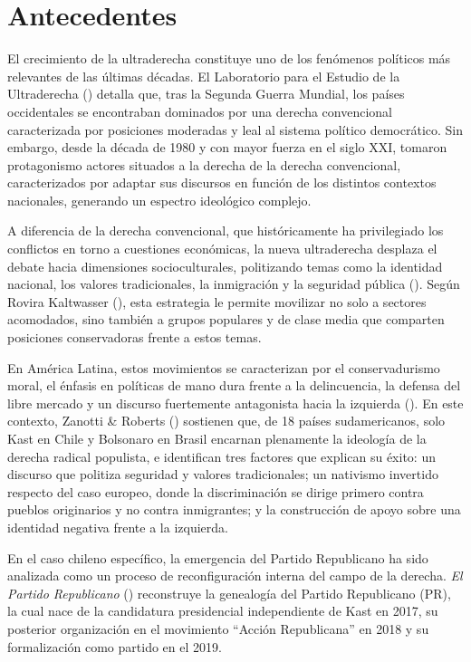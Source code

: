 \documentclass[
  spanish,
  a4paper,
  oneside]{scrbook}
\begin{document}
\chapter{Antecedentes}\label{antecedentes}

El crecimiento de la ultraderecha constituye uno de los fenómenos
políticos más relevantes de las últimas décadas. El Laboratorio para el
Estudio de la Ultraderecha () detalla
que, tras la Segunda Guerra Mundial, los países occidentales se
encontraban dominados por una derecha convencional caracterizada por
posiciones moderadas y leal al sistema político democrático. Sin
embargo, desde la década de 1980 y con mayor fuerza en el siglo XXI,
tomaron protagonismo actores situados a la derecha de la derecha
convencional, caracterizados por adaptar sus discursos en función de los
distintos contextos nacionales, generando un espectro ideológico
complejo.

A diferencia de la derecha convencional, que históricamente ha
privilegiado los conflictos en torno a cuestiones económicas, la nueva
ultraderecha desplaza el debate hacia dimensiones socioculturales,
politizando temas como la identidad nacional, los valores tradicionales,
la inmigración y la seguridad pública
(). Según
Rovira Kaltwasser
(), esta
estrategia le permite movilizar no solo a sectores acomodados, sino
también a grupos populares y de clase media que comparten posiciones
conservadoras frente a estos temas.

En América Latina, estos movimientos se caracterizan por el
conservadurismo moral, el énfasis en políticas de mano dura frente a la
delincuencia, la defensa del libre mercado y un discurso fuertemente
antagonista hacia la izquierda (). En este contexto, Zanotti \& Roberts
() sostienen que, de 18 países
sudamericanos, solo Kast en Chile y Bolsonaro en Brasil encarnan
plenamente la ideología de la derecha radical populista, e identifican
tres factores que explican su éxito: un discurso que politiza seguridad
y valores tradicionales; un nativismo invertido respecto del caso
europeo, donde la discriminación se dirige primero contra pueblos
originarios y no contra inmigrantes; y la construcción de apoyo sobre
una identidad negativa frente a la izquierda.

En el caso chileno específico, la emergencia del Partido Republicano ha
sido analizada como un proceso de reconfiguración interna del campo de
la derecha. \emph{El {Partido Republicano}}
() reconstruye la genealogía del Partido
Republicano (PR), la cual nace de la candidatura presidencial
independiente de Kast en 2017, su posterior organización en el
movimiento ``Acción Republicana'' en 2018 y su formalización como
partido en el 2019.
\end{document}
